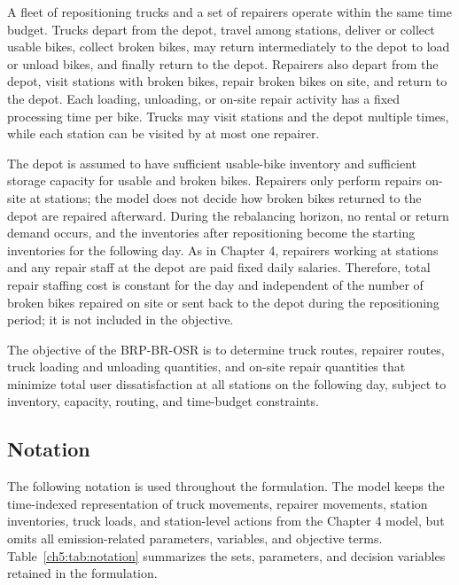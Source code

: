 A fleet of repositioning trucks and a set of repairers operate within the same
time budget. Trucks depart from the depot, travel among stations, deliver or
collect usable bikes, collect broken bikes, may return intermediately to the
depot to load or unload bikes, and finally return to the depot. Repairers also
depart from the depot, visit stations with broken bikes, repair broken bikes
on site, and return to the depot. Each loading, unloading, or on-site repair
activity has a fixed processing time per bike. Trucks may visit stations and the
depot multiple times, while each station can be visited by at most one repairer.

The depot is assumed to have sufficient usable-bike inventory and sufficient
storage capacity for usable and broken bikes. Repairers only perform repairs
on-site at stations; the model does not decide how broken bikes returned to the
depot are repaired afterward. During the rebalancing horizon, no rental or return
demand occurs, and the inventories after repositioning become the starting
inventories for the following day. As in Chapter 4, repairers working at
stations and any repair staff at the depot are paid fixed daily salaries.
Therefore, total repair staffing cost is constant for the day and independent of
the number of broken bikes repaired on site or sent back to the depot during the
repositioning period; it is not included in the objective.

The objective of the BRP-BR-OSR is to determine truck routes, repairer routes,
truck loading and unloading quantities, and on-site repair quantities that
minimize total user dissatisfaction at all stations on the following day, subject
to inventory, capacity, routing, and time-budget constraints.

\subsection{Notation}\label{ch5:sec:notation}

The following notation is used throughout the formulation. The model keeps the
time-indexed representation of truck movements, repairer movements, station
inventories, truck loads, and station-level actions from the Chapter 4 model,
but omits all emission-related parameters, variables, and objective terms.
Table~\ref{ch5:tab:notation} summarizes the sets,
parameters, and decision variables retained in the formulation.


